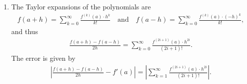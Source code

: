 \documentclass[a4paper,12pt]{article}
\begin{document}
\begin{enumerate}
    \item
        The Taylor expansions of the polynomials are
        \begin{align*}
            f(a + h) = \sum_{k = 0}^\infty \frac{f^{(k)}(a) \cdot h^k}{k!} \quad \text{and} \quad f(a - h) = \sum_{k = 0}^\infty \frac{f^{(k)}(a) \cdot (-h)^k}{k!},
        \end{align*}
        and thus
        \begin{align*}
            \frac{f(a + h) - f(a - h)}{2h} = \sum_{k = 0}^\infty \frac{f^{(2i + 1)}(a) \cdot h^{2i}}{(2i + 1)!}.
        \end{align*}
        The error is given by
        \begin{align*}
            \left| \frac{f(a + h) - f(a - h)}{2h} - f'(a) \right| = \left| \sum_{k = 1}^\infty \frac{f^{(2i + 1)}(a) \cdot h^{2i}}{(2i + 1)!} \right|.
        \end{align*}


\end{enumerate}
\end{document}
